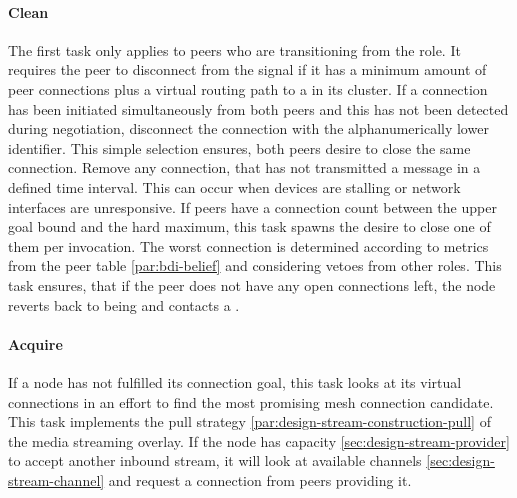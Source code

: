 \paragraph{Clean}
\begin{itemize}
     The first task only applies to peers who are transitioning from the \newbieRole role. It requires the peer to disconnect from the signal if it has a minimum amount of peer connections plus a virtual routing path to a \routerRole in its cluster.
     If a connection has been initiated simultaneously from both peers and this has not been detected during negotiation, disconnect the connection with the alphanumerically lower identifier. This simple selection ensures, both peers desire to close the same connection.
     Remove any connection, that has not transmitted a message in a defined time interval. This can occur when devices are stalling or network interfaces are unresponsive.
     If peers have a connection count between the upper goal bound and the hard maximum, this task spawns the desire to close one of them per invocation. The worst connection is determined according to metrics from the peer table \cref{par:bdi-belief} and considering vetoes from other roles.
     This task ensures, that if the peer does not have any open connections left, the node reverts back to being \newbieRole and contacts a \signalRole.
\end{itemize}

\paragraph{Acquire}
\begin{itemize}
     If a node has not fulfilled its connection goal, this task looks at its virtual connections in an effort to find the most promising mesh connection candidate.
     This task implements the pull strategy \cref{par:design-stream-construction-pull} of the media streaming overlay. If the node has capacity \cref{sec:design-stream-provider} to accept another inbound stream, it will look at available channels \cref{sec:design-stream-channel} and request a connection from peers providing it.
\end{itemize}

